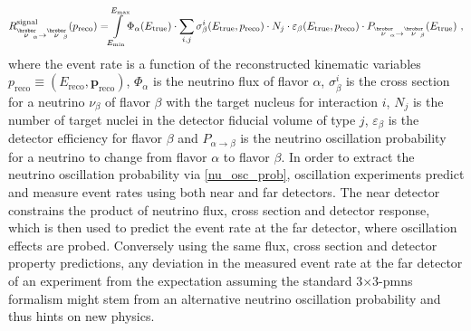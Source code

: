 %
\vspace{-3mm}
    \begin{align} \label{nu_osc_prob}
        R^\text{signal}_{\overset{\brobor}{\nu}_{\hspace{-1mm}\alpha}\rightarrow\overset{\brobor}{\nu}_{\hspace{-1mm}\beta}}(p_\text{reco}) = \hspace{-1mm}\int\displaylimits_{E_\text{min}}^{E_\text{max}} \hspace{-1mm}\Phi_\alpha(E_\text{true}) \cdot \sum_{i,j} \sigma^i_\beta(E_\text{true}, p_\text{reco}) \cdot N_j \cdot \varepsilon_\beta(E_\text{true}, p_\text{reco}) \cdot P_{\overset{\brobor}{\nu}_{\hspace{-1mm}\alpha}\rightarrow\overset{\brobor}{\nu}_{\hspace{-1mm}\beta}}(E_\text{true}) \ ,
    \end{align}
where the event rate is a function of the reconstructed kinematic variables $p_\text{reco} \equiv (E_\text{reco}, \mathbf{p}_\text{reco})$, $\Phi_\alpha$ is the neutrino flux of flavor $\alpha$, $\sigma^i_\beta$ is the cross section for a neutrino $\nu_\beta$ of flavor $\beta$ with the target nucleus for interaction $i$, $N_j$ is the number of target nuclei in the detector fiducial volume of type $j$, $\varepsilon_\beta$ is the detector efficiency for flavor $\beta$ and $P_{\alpha\rightarrow\beta}$ is the neutrino oscillation probability for a neutrino to change from flavor $\alpha$ to flavor $\beta$. In order to extract the neutrino oscillation probability via \cref{nu_osc_prob}, oscillation experiments predict and measure %
event rates using both near and far detectors. The near detector constrains the product of neutrino flux, cross section and detector response, which is then used to predict the event rate at the far detector, where oscillation effects are probed. Conversely using the same flux, cross section and detector property predictions, any deviation in the measured event rate at the far detector of an experiment from the expectation assuming the standard $3$$\times$$3$-\acrshort{pmns} formalism  might stem from an alternative neutrino oscillation probability and thus hints on new physics.

